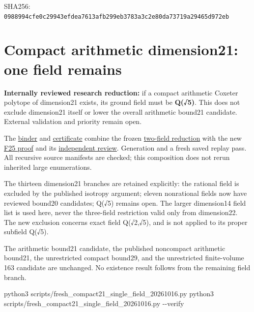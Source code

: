 \documentclass[
  10pt,
]{report}
\newenvironment{Shaded}{}{}
\newcommand{\AttributeTok}[1]{\textcolor[rgb]{0.49,0.56,0.16}{#1}}
\newcommand{\ExtensionTok}[1]{#1}
\newcommand{\NormalTok}[1]{#1}
\begin{document}
SHA256:
\nolinkurl{0988994cfe0c29943efdea7613afb299eb3783a3c2e80da73719a29465d972eb}

\chapter{Compact arithmetic dimension21: one field
remains}\label{compact-arithmetic-dimension21-one-field-remains}

\textbf{Internally reviewed research reduction:} if a compact arithmetic
Coxeter polytope of dimension21 exists, its ground field must be
\textbf{Q(√5)}. This does not exclude dimension21 itself or lower the
overall arithmetic bound21 candidate. External validation and priority
remain open.

The \href{../scripts/fresh_compact21_single_field_20261016.py}{binder}
and \href{fresh_compact21_single_field_20261016.json}{certificate}
combine the frozen
\href{fresh_compact21_field_reduction_20261016.md}{two-field reduction}
with the new \href{fresh_sqrt2sqrt5_lanner_catalogue_20261016.md}{F25
proof} and its
\href{fresh_sqrt2sqrt5_lanner_catalogue_20261016_review.md}{independent
review}. Generation and a fresh saved replay pass. All recursive source
manifests are checked; this composition does not rerun inherited large
enumerations.

The thirteen dimension21 branches are retained explicitly: the rational
field is excluded by the published isotropy argument; eleven nonrational
fields now have reviewed bound20 candidates; Q(√5) remains open. The
larger dimension14 field list is used here, never the three-field
restriction valid only from dimension22. The new exclusion concerns
exact field Q(√2,√5), and is not applied to its proper subfield Q(√5).

The arithmetic bound21 candidate, the published noncompact arithmetic
bound21, the unrestricted compact bound29, and the unrestricted
finite-volume 163 candidate are unchanged. No existence result follows
from the remaining field branch.

\begin{Shaded}
\begin{Highlighting}[]
\ExtensionTok{python3}\NormalTok{ scripts/fresh\_compact21\_single\_field\_20261016.py}
\ExtensionTok{python3}\NormalTok{ scripts/fresh\_compact21\_single\_field\_20261016.py }\AttributeTok{{-}{-}verify}
\end{Highlighting}
\end{Shaded}

\clearpage
\end{document}
